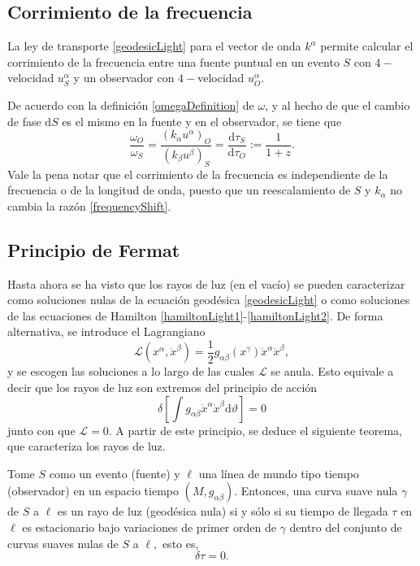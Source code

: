 \subsection{Corrimiento de la frecuencia}
La ley de transporte \eqref{geodesicLight} para el vector de onda $k^\alpha$ permite calcular el corrimiento de la frecuencia entre una fuente puntual en un evento $S$ con $4-$velocidad $u_S^\alpha$ y un observador con $4-$velocidad $u_O^\alpha$.

De acuerdo con la definición \eqref{omegaDefinition} de $\omega$, y al hecho de que el cambio de fase $\mathrm{d}S$ es el mismo en la fuente y en el observador, se tiene que
\begin{equation}\label{frequencyShift}
	\frac{\omega_O}{\omega_S}=\frac{(k_\alpha u^\alpha)_O}{(k_\beta u^\beta)_S}=\frac{\mathrm{d}\tau_S}{\mathrm{d}\tau_O}:=\frac{1}{1+z}.
\end{equation}
Vale la pena notar que el corrimiento de la frecuencia es independiente de la frecuencia o de la longitud de onda, puesto que un reescalamiento de $S$ y $k_\alpha$ no cambia la razón \eqref{frequencyShift}.
\subsection{Principio de Fermat}
Hasta ahora se ha visto que los rayos de luz (en el vacío) se pueden caracterizar como soluciones nulas de la ecuación geodésica \eqref{geodesicLight} o como soluciones de las ecuaciones de Hamilton \eqref{hamiltonLight1}-\eqref{hamiltonLight2}. De forma alternativa, se introduce el Lagrangiano
\begin{equation}
	\mathcal{L}(x^\alpha, \dot{x}^\beta)=\frac{1}{2}g_{\alpha\beta}(x^\gamma)\dot{x}^\alpha\dot{x}^\beta,
\end{equation}
y se escogen las soluciones a lo largo de las cuales $\mathcal{L}$ se anula. Esto equivale a decir que los rayos de luz son extremos del principio de acción 
\begin{equation}
	\delta\left[\int g_{\alpha\beta}\dot{x}^\alpha\dot{x}^\beta \mathrm{d}\vartheta \right]=0
\end{equation}
junto con que $\mathcal{L}=0$. A partir de este principio, se deduce el siguiente teorema, que caracteriza los rayos de luz.
\begin{theo}
Tome $S$ como un evento (fuente) y $\ell$ una línea de mundo tipo tiempo (observador) en un espacio tiempo $(M, g_{\alpha\beta})$. Entonces, una curva suave nula $\gamma$ de $S$ a $\ell$ es un rayo de luz (geodésica nula) si y sólo si su tiempo de llegada $\tau$ en $\ell$ es estacionario bajo variaciones de primer orden de $\gamma$ dentro del conjunto de curvas suaves nulas de $S$ a $\ell,$ esto es,
\begin{equation}
	\delta \tau=0.
\end{equation}
\end{theo}

